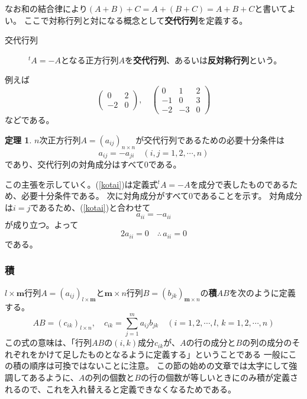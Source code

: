 \documentclass[10pt]{jsarticle}
\theoremstyle{definition}%
\newtheorem{thm}{定理}[section]%
\numberwithin{equation}{section}%
\begin{document}
なお和の結合律により$(A+B)+C=A+(B+C)=A+B+C$と書いてよい。
ここで対称行列と対になる概念として{\bf 交代行列}を定義する。
\begin{framed}
\begin{description}
  \item[交代行列] ${}^{t}A=-A$となる正方行列$A$を{\bf 交代行列}、あるいは{\bf 反対称行列}という。
\end{description}
\end{framed}
例えば
\begin{equation}
  \left(  
      \begin{matrix}
        0 & 2  \\
        -2 & 0
      \end{matrix}
    \right), \quad \left(  
      \begin{matrix}
        0 & 1 & 2\\
        -1 & 0 & 3\\
        -2& -3 & 0 
      \end{matrix}
    \right)
\end{equation}
などである。
\begin{screen}
  \begin{thm}
    $n$次正方行列$A=(a_{ij})_{n\times n}$が交代行列であるための必要十分条件は
    \begin{equation}
  \label{kotai}    a_{ij}=-a_{ji} \quad (i,j=1,2,\cdots ,n)
    \end{equation}
    であり、交代行列の対角成分はすべて0である。
  \end{thm}
\end{screen}
この主張を示していく。(\ref{kotai})は定義式${}^{t}A=-A$を成分で表したものであるため、必要十分条件である。
次に対角成分がすべて0であることを示す。
対角成分は$i=j$であるため、(\ref{kotai})と合わせて
\begin{equation}
  a_{ii}=-a_{ii}
\end{equation}
が成り立つ。よって
\begin{equation}
  2a_{ii}=0  \quad  \therefore \, a_{ii}=0
\end{equation}
である。
\subsubsection{積}
$l\times \bm{m}$行列$A=(a_{ij})_{l\times \bm{m}}$と$\bm{m}\times n$行列$B=(b_{jk})_{\bm{m}\times n}$の{\bf 積}$AB$を次のように定義する。
\begin{equation}
  AB=(c_{ik})_{l\times n},\quad c_{ik}=\sum_{j=1}^{m} a_{ij}b_{jk}\quad (i=1,2,\cdots ,l,\, k=1,2,\cdots , n)
\end{equation}
この式の意味は、「行列$AB$の$(i,k)$成分$c_{ik}$が、$A$の行の成分と$B$の列の成分のそれぞれをかけて足したものとなるように定義する」ということである
一般にこの積の順序は可換ではないことに注意。
この節の始めの文章では太字にして強調してあるように、$A$の列の個数と$B$の行の個数が等しいときにのみ積が定義されるので、これを入れ替えると定義できなくなるためである。
\end{document}
